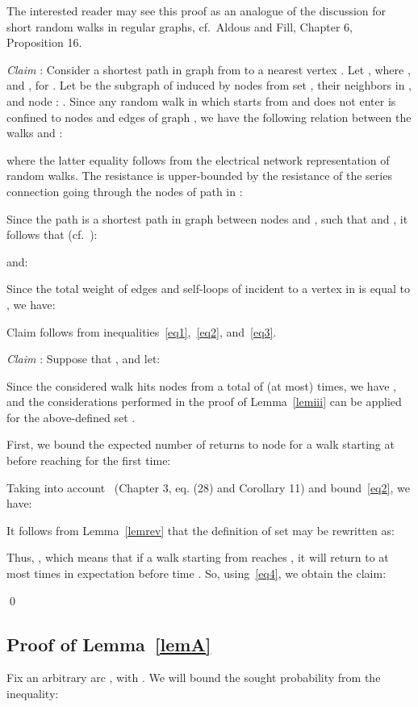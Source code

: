 \documentclass[11pt,a4paper]{article}
\renewcommand{\*}{\hspace*{5mm}}
\begin{document}
The interested reader may see this proof as an analogue of the discussion for short random walks in regular graphs, cf.~Aldous and Fill, Chapter 6, Proposition 16.

\emph{Claim} : Consider a shortest path  in graph  from  to a nearest vertex . Let , where , and ,  for . Let  be the subgraph of  induced by nodes from set , their neighbors in , and node : . Since any random walk in  which starts from  and does not enter  is confined to nodes and edges of graph , we have the following relation between the walks  and :

where the latter equality follows from the electrical network representation of random walks. The resistance  is upper-bounded by the resistance of the series connection going through the nodes of path  in :


Since the path  is a shortest path in graph  between nodes  and , such that  and , it follows that (cf.~\cite{AF}):

and:

Since the total weight of edges and self-loops of  incident to a vertex in  is equal to , we have:

Claim  follows from inequalities~\eqref{eq1},~\eqref{eq2}, and~\eqref{eq3}.

\medskip
\noindent
\emph{Claim} : Suppose that , and let:

Since the considered walk hits nodes from  a total of (at most)  times, we have , and the considerations performed in the proof of Lemma~\ref{lemiii} can be applied for the above-defined set .

First, we bound the expected number of returns to node  for a walk starting at  before reaching  for the first time:

Taking into account~\cite{AF} (Chapter 3, eq. (28) and Corollary 11) and bound~\eqref{eq2}, we have:


It follows from Lemma~\ref{lemrev} that the definition of set  may be rewritten as:

Thus, , which means that if a walk starting from  reaches , it will return to  at most  times in expectation before time . So, using~\eqref{eq4}, we obtain the claim:


\qed


\subsection*{Proof of Lemma~\ref{lemA}}

Fix an arbitrary arc , with . We will bound the sought probability from the inequality:
\end{document}
